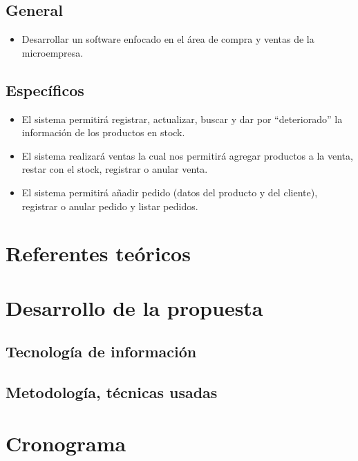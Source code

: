 \documentclass[preprint,12pt]{elsarticle}
\begin{document}
		\subsection{\textbf{ General }}
	 \begin{itemize}
		\item Desarrollar un software enfocado en el área de compra y ventas de la microempresa.
	 \end{itemize}
		\subsection{\textbf{Específicos }}
\begin{itemize}
	\item El sistema permitirá registrar, actualizar, buscar y dar por “deteriorado” la información de los productos en stock.
	\item El sistema realizará ventas la cual nos permitirá agregar productos a la venta, restar con el stock, registrar o anular venta. 
	\item El sistema permitirá añadir pedido (datos del producto y del cliente), registrar o anular pedido y listar pedidos. 
	\end{itemize}

	\section{Referentes teóricos}

	\section{Desarrollo de la propuesta}

		\subsection{\textbf{Tecnología de información  }}
		
		\subsection{\textbf{ Metodología, técnicas usadas  }}
\section{Cronograma }
	
	\newpage
	
		


\end{document}
